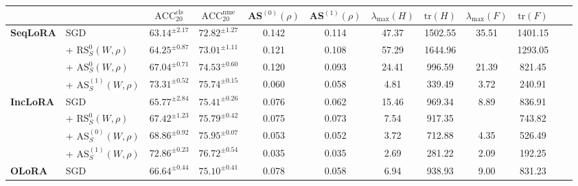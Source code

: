 \documentclass{article}
\theoremstyle{plain}
\theoremstyle{definition}
\theoremstyle{remark}
\begin{document}
\begin{table}[thpb]
{\begin{tabular}{l l cccc cc cccc}
\cmidrule(lr){3-4}\cmidrule(lr){5-6}\cmidrule(lr){7-10}
 & & $\operatorname{ACC}_{20}^{\mathrm{cls}}$  %
&$\operatorname{ACC}_{20}^{\mathrm{nme}}$ 
 & AS$^{(0)}(\rho)$  & AS$^{(1)}(\rho)$
 & $\lambda_{\max}(H)$ & $\mathrm{tr}(H)$  
 & $\lambda_{\max}(F)$ & $\mathrm{tr}(F)$   \\
\midrule
\multirow{4}{*}{\textbf{SeqLoRA}}
& SGD    &$63.14^{\pm 2.17}$ & $72.82^{\pm 1.27}$  & 0.142  & 0.114 & 47.37 & 1502.55 & 35.51 & 1401.15 \\\
& + $\mathrm{RS}^{0}_S(W,\rho)$  &$64.25^{\pm 0.87}$ & $73.01^{\pm 1.11}$ &0.121 &0.108 &57.29 &1644.96 & &1293.05\\
& + $\mathrm{AS}^{0}_S(W,\rho)$    &$67.04^{\pm 0.71}$ & $74.53^{\pm 0.60}$ & 0.120  & 0.093 & 24.41   & 996.59   & 21.39  & 821.45   \\
 & + $\mathrm{AS}^{(1)}_S(W,\rho)$   &$73.31^{\pm 0.52}$ & $75.74^{\pm 0.15}$  & 0.060  &0.058  & 4.81    & 339.49   & 3.72   & 240.91   \\
\midrule
\multirow{2}{*}{\textbf{IncLoRA}}
& SGD    &$65.77^{\pm 2.84}$  &$75.41^{\pm 0.26}$ & 0.076    & 0.062 & 15.46 & 969.34  & 8.89  & 836.91 \\
& + $\mathrm{RS}^{0}_S(W,\rho)$ & $67.42^{\pm 1.23}$ & $75.79^{\pm 0.42}$  &0.075 &0.073 &7.54 &917.35 & &743.82\\
& + $\mathrm{AS}^{(0)}_S(W,\rho)$    &$68.86^{\pm 0.92}$ & $75.95^{\pm 0.07}$  & 0.053   & 0.052 & 3.72    & 712.88   & 4.35   & 526.49   \\
 &+ $\mathrm{AS}^{(1)}_S(W,\rho)$  &$72.86^{\pm 0.23}$ & $76.72^{\pm 0.54}$  & 0.035   & 0.035 & 2.69    & 281.22   & 2.09   & 192.25   \\
\midrule
\multirow{2}{*}{\textbf{OLoRA}}
& SGD    &$66.64^{\pm 0.44}$ & $75.10^{\pm 0.41}$  & 0.078   & 0.058 & 6.94    & 938.93   & 9.00   & 831.23   \\

\end{tabular}}
\end{table}
\end{document}
